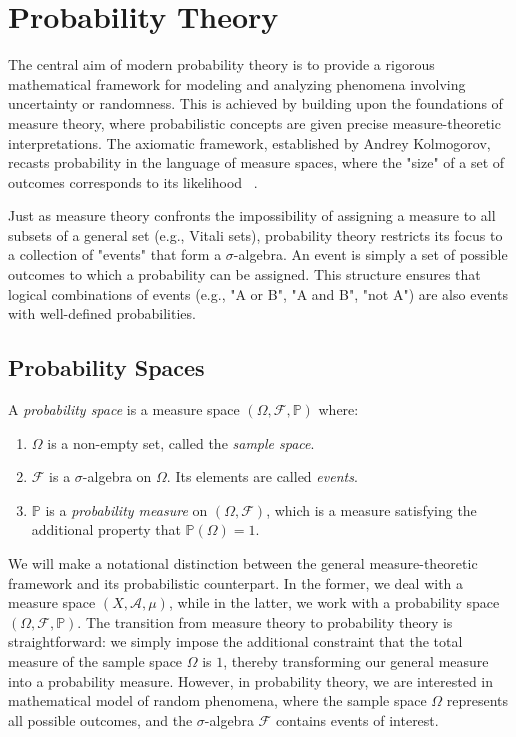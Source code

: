 \section{Probability Theory}\label{sec:probability-theory}


\indent
The central aim of modern probability theory is to provide a rigorous mathematical framework for modeling and analyzing phenomena involving uncertainty or randomness. This is achieved by building upon the foundations of measure theory, where probabilistic concepts are given precise measure-theoretic interpretations. The axiomatic framework, established by Andrey Kolmogorov, recasts probability in the language of measure spaces, where the "size" of a set of outcomes corresponds to its likelihood ~\cite[Chap 8]{MeasureTheoryLeGall}.

Just as measure theory confronts the impossibility of assigning a measure to all subsets of a general set (e.g., Vitali sets), probability theory restricts its focus to a collection of "events" that form a $\sigma$-algebra. An event is simply a set of possible outcomes to which a probability can be assigned. This structure ensures that logical combinations of events (e.g., "A or B", "A and B", "not A") are also events with well-defined probabilities.

\subsection{Probability Spaces}


\begin{definition}
    \label{def:probability-space}
    A \emph{probability space} is a measure space $(\Omega, \mathcal{F}, \mathbb{P})$ where:
    \begin{enumerate}[label=(\roman*)]
        \item $\Omega$ is a non-empty set, called the \emph{sample space}.
        \item $\mathcal{F}$ is a $\sigma$-algebra on $\Omega$. Its elements are called \emph{events}.
        \item $\mathbb{P}$ is a \emph{probability measure} on $(\Omega, \mathcal{F})$, which is a measure satisfying the additional property that $\mathbb{P}(\Omega) = 1$.
    \end{enumerate}
\end{definition}

We will make a notational distinction between the general measure-theoretic framework and its probabilistic counterpart. In the former, we deal with a measure space $(X, \mathcal{A}, \mu)$, while in the latter, we work with a probability space $(\Omega, \mathcal{F}, \mathbb{P})$. The transition from measure theory to probability theory is straightforward: we simply impose the additional constraint that the total measure of the sample space $\Omega$ is $1$, thereby transforming our general measure into a probability measure. However, in probability theory, we are interested in mathematical model of random phenomena, where the sample space $\Omega$ represents all possible outcomes, and the $\sigma$-algebra $\mathcal{F}$ contains events of interest.


